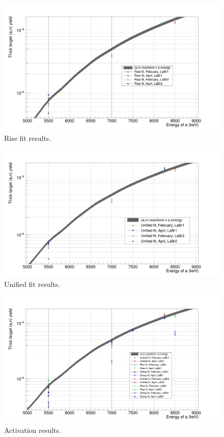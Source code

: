 \documentclass[a4paper,12pt]{report}
\begin{document}
\begin{figure}[H]
	\centering
	\includegraphics[width=\textwidth]{reactions_v_energy_rise.png}
	\caption{Rise fit results.}
	\label{reactions_v_energy_rise}
\end{figure}

\begin{figure}[H]
	\centering
	\includegraphics[width=\textwidth]{reactions_v_energy_unified.png}
	\caption{Unified fit results.}
	\label{reactions_v_energy_unified}
\end{figure}

\begin{figure}[H]
	\centering
	\includegraphics[width=\textwidth]{reactions_v_energy.png}
	\caption{Activation results.}
	\label{reactions_v_energy}
\end{figure}
\end{document}
